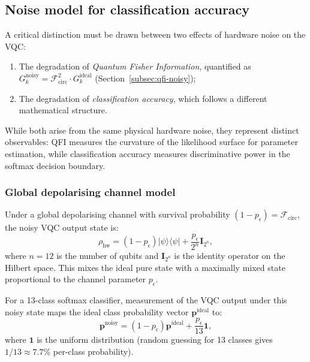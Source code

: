 
\subsection{Noise model for classification accuracy}
\label{subsec:noise_model_accuracy}

A critical distinction must be drawn between two effects of hardware noise on the VQC:
\begin{enumerate}
  \item The degradation of \emph{Quantum Fisher Information}, quantified as $G_k^\text{noisy} = \mathcal{F}_\text{circ}^2 \cdot G_k^\text{ideal}$ (Section~\ref{subsec:qfi-noisy});
  \item The degradation of \emph{classification accuracy}, which follows a different mathematical structure.
\end{enumerate}

While both arise from the same physical hardware noise, they represent distinct observables:
QFI measures the curvature of the likelihood surface for parameter estimation, while classification accuracy measures discriminative power in the softmax decision boundary.

\subsubsection{Global depolarising channel model}

Under a global depolarising channel with survival probability $(1-p_\epsilon) = \mathcal{F}_\text{circ}$, the noisy VQC output state is:
\begin{equation}
  \label{eq:global_depolarising}
  \rho_\text{hw} = (1-p_\epsilon)|\psi\rangle\langle\psi| + \frac{p_\epsilon}{2^n}\mathbf{I}_{2^n},
\end{equation}
where $n=12$ is the number of qubits and $\mathbf{I}_{2^n}$ is the identity operator on the Hilbert space.
This mixes the ideal pure state with a maximally mixed state proportional to the channel parameter $p_\epsilon$.

For a 13-class softmax classifier, measurement of the VQC output under this noisy state maps the ideal class probability vector $\mathbf{p}^\text{ideal}$ to:
\begin{equation}
  \label{eq:noisy_probs}
  \mathbf{p}^\text{noisy} = (1-p_\epsilon)\mathbf{p}^\text{ideal} + \frac{p_\epsilon}{13}\mathbf{1},
\end{equation}
where $\mathbf{1}$ is the uniform distribution (random guessing for 13 classes gives $1/13 \approx 7.7\%$ per-class probability).


